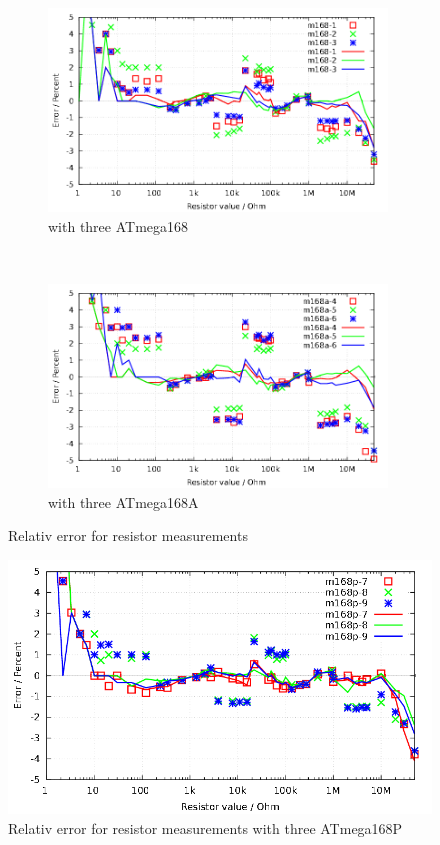 \begin{figure}[H]
  \begin{subfigure}[b]{9cm}
    \centering
    \includegraphics[width=9cm]{../GNU/m168res_all.pdf}
    \caption{with three ATmega168}
    \label{fig:m168res_all}
  \end{subfigure}
  ~
  \begin{subfigure}[b]{9cm}
    \centering
    \includegraphics[width=9cm]{../GNU/m168ares_all.pdf}
    \caption{with three ATmega168A}
    \label{fig:m168ares_all}
  \end{subfigure}
\caption{Relativ error for resistor measurements}
\end{figure}

\begin{figure}[H]
\centering
\includegraphics[width=16cm]{../GNU/m168pres_all.pdf}
\caption{Relativ error for resistor measurements with three ATmega168P }
\label{fig:m168pres_all}
\end{figure}

